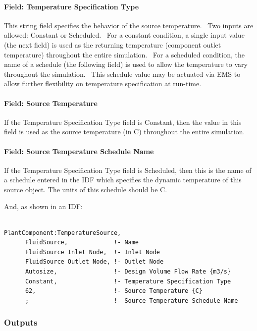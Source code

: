 \paragraph{Field: Temperature Specification Type}\label{field-temperature-specification-type}

This string field specifies the behavior of the source temperature.~ Two inputs are allowed: Constant or Scheduled.~ For a constant condition, a single input value (the next field) is used as the returning temperature (component outlet temperature) throughout the entire simulation.~ For a scheduled condition, the name of a schedule (the following field) is used to allow the temperature to vary throughout the simulation.~ This schedule value may be actuated via EMS to allow further flexibility on temperature specification at run-time.

\paragraph{Field: Source Temperature}\label{field-source-temperature}

If the Temperature Specification Type field is Constant, then the value in this field is used as the source temperature (in C) throughout the entire simulation.

\paragraph{Field: Source Temperature Schedule Name}\label{field-source-temperature-schedule-name}

If the Temperature Specification Type field is Scheduled, then this is the name of a schedule entered in the IDF which specifies the dynamic temperature of this source object. The units of this schedule should be C.

And, as shown in an IDF:

\begin{lstlisting}

PlantComponent:TemperatureSource,
      FluidSource,             !- Name
      FluidSource Inlet Node,  !- Inlet Node
      FluidSource Outlet Node, !- Outlet Node
      Autosize,                !- Design Volume Flow Rate {m3/s}
      Constant,                !- Temperature Specification Type
      62,                      !- Source Temperature {C}
      ;                        !- Source Temperature Schedule Name
\end{lstlisting}

\subsubsection{Outputs}\label{outputs-16-000}

